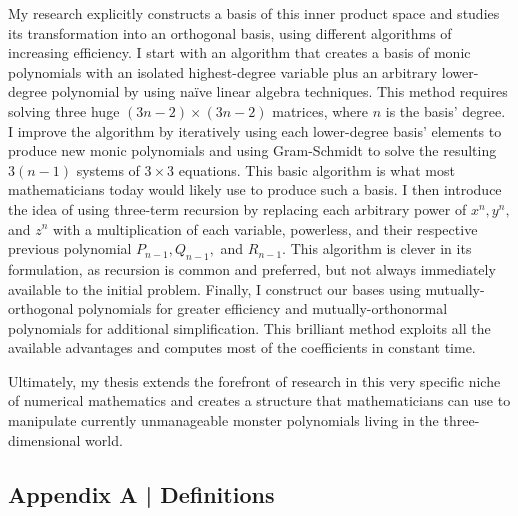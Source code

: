 \documentclass[letterpaper, 12pt]{article}
\begin{document}
My research explicitly constructs a basis of this inner product space and studies its transformation into an orthogonal basis, using different algorithms of increasing efficiency. I start with an algorithm that creates a basis of monic polynomials with an isolated highest-degree variable plus an arbitrary lower-degree polynomial by using na\"ive linear algebra techniques. This method requires solving three huge $(3n-2)\times (3n-2)$ matrices, where $n$ is the basis' degree. I improve the algorithm by iteratively using each lower-degree basis' elements to produce new monic polynomials and using Gram-Schmidt to solve the resulting $3(n-1)$ systems of $3\times 3$ equations. This basic algorithm is what most mathematicians today would likely use to produce such a basis. I then introduce the idea of using three-term recursion by replacing each arbitrary power of $x^n, y^n,$ and $z^n$ with a multiplication of each variable, powerless, and their respective previous polynomial $P_{n-1}, Q_{n-1},$ and $R_{n-1}$. This algorithm is clever in its formulation, as recursion is common and preferred, but not always immediately available to the initial problem. Finally, I construct our bases using mutually-orthogonal polynomials for greater efficiency and mutually-orthonormal polynomials for additional simplification. This brilliant method exploits all the available advantages and computes most of the coefficients in constant time.

Ultimately, my thesis extends the forefront of research in this very specific niche of numerical mathematics and creates a structure that mathematicians can use to manipulate currently unmanageable monster polynomials living in the three-dimensional world.  







\newpage
{}
\begin{centering}\section*{Appendix A | Definitions}\end{centering}
\end{document}
